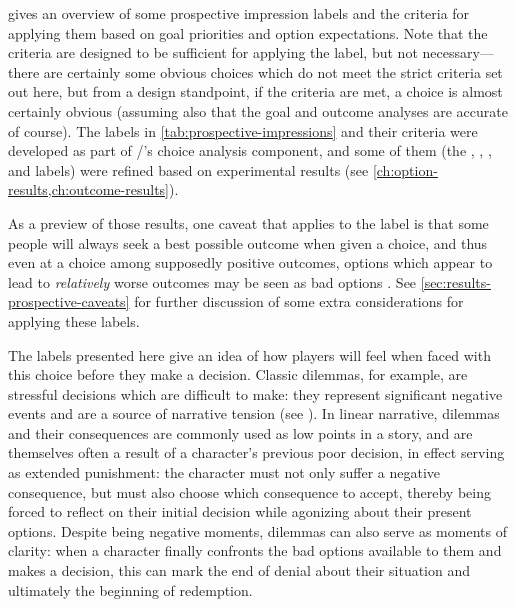  gives an overview of some prospective impression labels and the criteria for applying them based on goal priorities and option expectations.
%
Note that the criteria are designed to be sufficient for applying the label, but not necessary---there are certainly some obvious choices which do not meet the strict criteria set out here, but from a design standpoint, if the criteria are met, a choice is almost certainly obvious (assuming also that the goal and outcome analyses are accurate of course).
%
The labels in \cref{tab:prospective-impressions} and their criteria were developed as part of \dunyazad/'s choice analysis component, and some of them (the , , , and  labels) were refined based on experimental results (see \cref{ch:option-results,ch:outcome-results}).


As a preview of those results, one caveat that applies to the  label is that some people will always seek a best possible outcome when given a choice, and thus even at a choice among supposedly positive outcomes, options which appear to lead to \emph{relatively} worse outcomes may be seen as bad options \citep{Schwartz2002}.
%
See \cref{sec:results-prospective-caveats} for further discussion of some extra considerations for applying these labels.


The labels presented here give an idea of how players will feel when faced with this choice before they make a decision.
%
Classic dilemmas, for example, are stressful decisions which are difficult to make: they represent significant negative events and are a source of narrative tension (see \citep{Barber2007a}).
%
In linear narrative, dilemmas and their consequences are commonly used as low points in a story, and are themselves often a result of a character's previous poor decision, in effect serving as extended punishment: the character must not only suffer a negative consequence, but must also choose which consequence to accept, thereby being forced to reflect on their initial decision while agonizing about their present options.
%
Despite being negative moments, dilemmas can also serve as moments of clarity: when a character finally confronts the bad options available to them and makes a decision, this can mark the end of denial about their situation and ultimately the beginning of redemption.


